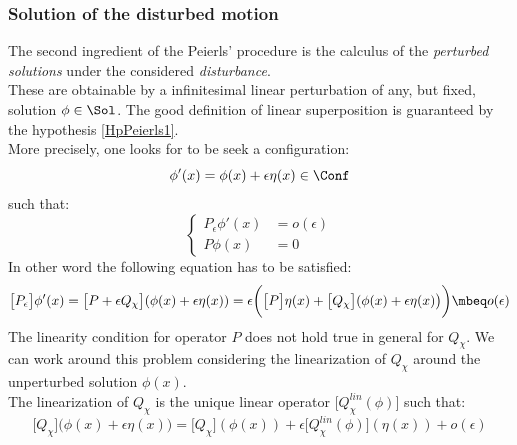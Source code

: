 \documentclass[Main]{subfiles}
\begin{document}
	\subsubsection{Solution of the disturbed motion}
		The second ingredient of the Peierls' procedure is the calculus of the \emph{perturbed solutions} under the considered \emph{disturbance}.
		\\
		These are obtainable by a infinitesimal linear perturbation of any, but fixed, solution $\phi \in \Sol$. The good definition of linear superposition is guaranteed by the hypothesis \ref{HpPeierls1}.
		\\
		More precisely, one looks for to be seek a configuration:
			\begin{displaymath}
					\phi'(x) = \phi(x) + \epsilon \eta(x) \in \Conf
			\end{displaymath}
		such that:
			\begin{displaymath}
				\begin{cases} 
					P_\epsilon \phi'(x) &= o(\epsilon)  \\ 
					P \phi(x) &= 0
				\end{cases}
			\end{displaymath}
		In other word the following equation has to be satisfied:
		\begin{displaymath}
			\big[P_\epsilon\big] \phi'(x) = \big[ P + \epsilon Q_\chi		\big]( \phi(x) + \epsilon \eta(x)) 
			= \epsilon \biggr( \big[P\big] \eta(x) + \big[Q_\chi \big]( \phi(x) + \epsilon \eta(x)\big)\biggr) \mbeq o(\epsilon)			
		\end{displaymath}
		The linearity condition for operator $P$ does not hold true in general for $Q_\chi$.
		We can work around this problem considering the linearization\cite[pag. 31]{Khavkine2014} of $Q_\chi$ around the unperturbed solution $\phi(x)$.
		\\
		The linearization of $Q_\chi$ is the unique linear operator $\big[Q_\chi^{lin}(\phi) \big]$ such that:
		\begin{displaymath}
			\big[Q_\chi \big]( \phi(x) + \epsilon \eta(x)\big)= \big[Q_\chi \big]( \phi(x)) + \epsilon \big[Q_\chi^{lin}(\phi)  \big]( \eta(x)) + o(\epsilon)
		\end{displaymath}
\end{document}
